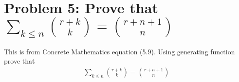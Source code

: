 ﻿\section{Problem 5: Prove that $\sum_{k \leq n} \binom{r+k}{k} = \binom{r+n+1}{n}$}
\label{sec:problem-5:-concrete-mathematics-5.9}
This is from Concrete Mathematics equation (5.9).
Using generating function prove that
\begin{align}
    \sum_{k \leq n} \binom{r+k}{k} = \binom{r+n+1}{n}
    \label{eq:identity-to-prove-problem-5}
\end{align}

\clearpage

